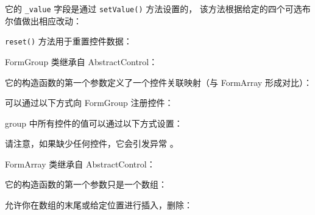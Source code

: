 它的 \texttt{\_value} 字段是通过 \texttt{setValue()} 方法设置的，
该方法根据给定的四个可选布尔值做出相应改动：




\texttt{reset()} 方法用于重置控件数据：




FormGroup 类继承自 AbstractControl：




它的构造函数的第一个参数定义了一个控件关联映射（与 FormArray 形成对比）：




可以通过以下方式向 FormGroup 注册控件：




group 中所有控件的值可以通过以下方式设置：




请注意，如果缺少任何控件，它会引发异常 。


FormArray 类继承自 AbstractControl：




它的构造函数的第一个参数只是一个数组：




允许你在数组的末尾或给定位置进行插入，删除：


